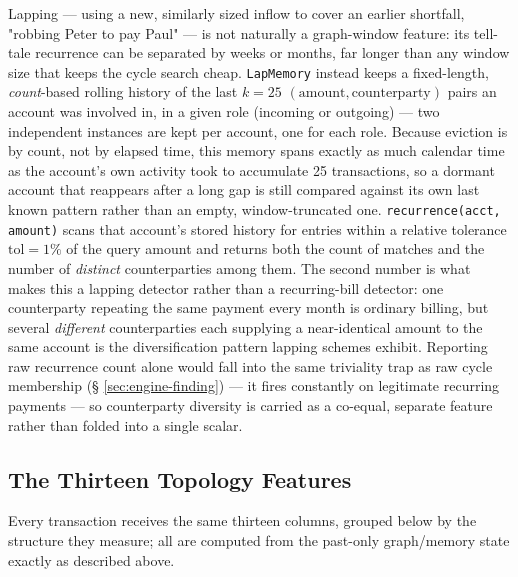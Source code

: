 Lapping — using a new, similarly sized inflow to cover an earlier shortfall,
"robbing Peter to pay Paul" — is not naturally a graph-window feature: its
tell-tale recurrence can be separated by weeks or months, far longer than any
window size that keeps the cycle search cheap. \texttt{LapMemory} instead
keeps a fixed-length, \emph{count}-based rolling history of the last $k=25$
$(\text{amount}, \text{counterparty})$ pairs an account was involved in, in a
given role (incoming or outgoing) — two independent instances are kept per
account, one for each role. Because eviction is by count, not by elapsed
time, this memory spans exactly as much calendar time as the account's own
activity took to accumulate 25 transactions, so a dormant account that
reappears after a long gap is still compared against its own last known
pattern rather than an empty, window-truncated one. \texttt{recurrence(acct,
amount)} scans that account's stored history for entries within a relative
tolerance $\mathrm{tol}=1\%$ of the query amount and returns both the count of
matches and the number of \emph{distinct} counterparties among them. The
second number is what makes this a lapping detector rather than a
recurring-bill detector: one counterparty repeating the same payment every
month is ordinary billing, but several \emph{different} counterparties each
supplying a near-identical amount to the same account is the diversification
pattern lapping schemes exhibit. Reporting raw recurrence count alone would
fall into the same triviality trap as raw cycle membership (\S
\ref{sec:engine-finding}) — it fires constantly on legitimate recurring
payments — so counterparty diversity is carried as a co-equal, separate
feature rather than folded into a single scalar.

\subsection{The Thirteen Topology Features}\label{sec:engine-features}

Every transaction receives the same thirteen columns, grouped below by the
structure they measure; all are computed from the past-only graph/memory
state exactly as described above.

